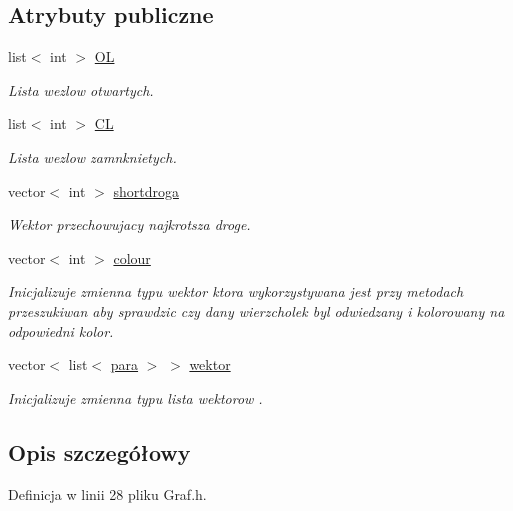 \subsection*{Atrybuty publiczne}
\begin{DoxyCompactItemize}
\item 
list$<$ int $>$ \hyperlink{class_graf_a7b668c8a19ae96d9ce221451296093ec}{O\-L}
\begin{DoxyCompactList}\small\item\em Lista wezlow otwartych. \end{DoxyCompactList}\item 
list$<$ int $>$ \hyperlink{class_graf_a1b3d532db5934e6f161b914794c444d5}{C\-L}
\begin{DoxyCompactList}\small\item\em Lista wezlow zamnknietych. \end{DoxyCompactList}\item 
vector$<$ int $>$ \hyperlink{class_graf_aaa294459b6beeae74c73cdc825bf42dd}{shortdroga}
\begin{DoxyCompactList}\small\item\em Wektor przechowujacy najkrotsza droge. \end{DoxyCompactList}\item 
vector$<$ int $>$ \hyperlink{class_graf_a8cc46484cf7f96ce274d87829bf10120}{colour}
\begin{DoxyCompactList}\small\item\em Inicjalizuje zmienna typu wektor ktora wykorzystywana jest przy metodach przeszukiwan aby sprawdzic czy dany wierzcholek byl odwiedzany i kolorowany na odpowiedni kolor. \end{DoxyCompactList}\item 
vector$<$ list$<$ \hyperlink{classpara}{para} $>$ $>$ \hyperlink{class_graf_a72ccd052ab732941488da20d198aa82c}{wektor}
\begin{DoxyCompactList}\small\item\em Inicjalizuje zmienna typu lista wektorow . \end{DoxyCompactList}\end{DoxyCompactItemize}


\subsection{Opis szczegółowy}


Definicja w linii 28 pliku Graf.\-h.



